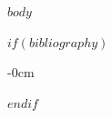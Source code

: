 \documentclass[sensors,article,submit,pdftex,moreauthors]{Definitions/mdpi}
\begin{document}
$body$

$if(bibliography)$
\begin{adjustwidth}{-\extralength}{0cm}


\end{adjustwidth}
$endif$
\end{document}
